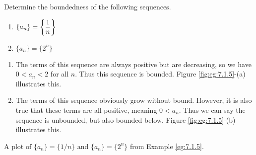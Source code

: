 \begin{example} \label{eg:7.1.5} %
Determine the boundedness of the following sequences.

\begin{enumerate}[1)]
\item $\displaystyle\{a_n\}  = \left\{\frac1n\right\}$ 
\item $\{a_n\} = \{2^n\}$
\end{enumerate}

\solution
\begin{enumerate}[1)]
\item The terms of this sequence are always positive but are decreasing, so we have $0<a_n<2$ for all $n$. Thus this sequence is bounded. Figure \ref{fig:eg:7.1.5}-(a) illustrates this.

\item The terms of this sequence obviously grow without bound. However, it is also true that these terms are all positive, meaning $0<a_n$. Thus we can say the sequence is unbounded, but also bounded below. Figure \ref{fig:eg:7.1.5}-(b) illustrates this.
\end{enumerate}
\end{example}

\begin{marginfigure}

\caption{A plot of $\{a_n\} = \{1/n\}$ and $\{a_n\} = \{2^n\}$ from Example \ref{eg:7.1.5}.}
\label{fig:eg:7.1.5}
\end{marginfigure}